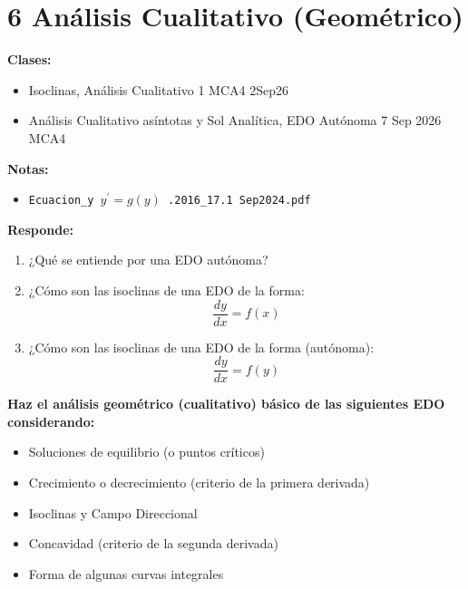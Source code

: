 \section{6 Análisis Cualitativo (Geométrico)}

\begin{tcolorbox}[enunciado]
\textbf{Clases:}
\begin{itemize}[leftmargin=*]
    \item Isoclinas, Análisis Cualitativo 1 MCA4 2Sep26
    \item Análisis Cualitativo asíntotas y Sol Analítica, EDO Autónoma 7 Sep 2026 MCA4
\end{itemize}

\textbf{Notas:}
\begin{itemize}[leftmargin=*]
    \item \texttt{Ecuacion\_y }$y^{\prime}=g(y)$\texttt{ .2016\_17.1 Sep2024.pdf}
\end{itemize}
\end{tcolorbox}

\vspace{0.3cm}
\textbf{Responde:}

\begin{enumerate}[label=\arabic*., leftmargin=*]
    \item ¿Qué se entiende por una EDO autónoma?
    
    \item ¿Cómo son las isoclinas de una EDO de la forma:
    \[ \frac{dy}{dx}=f(x) \]
    
    \item ¿Cómo son las isoclinas de una EDO de la forma (autónoma):
    \[ \frac{dy}{dx}=f(y) \]
\end{enumerate}

\vspace{0.3cm}
\noindent \textbf{Haz el análisis geométrico (cualitativo) básico de las siguientes EDO considerando:}
\begin{itemize}[leftmargin=*]
    \item Soluciones de equilibrio (o puntos críticos)
    \item Crecimiento o decrecimiento (criterio de la primera derivada)
    \item Isoclinas y Campo Direccional
    \item Concavidad (criterio de la segunda derivada)
    \item Forma de algunas curvas integrales
\end{itemize}

